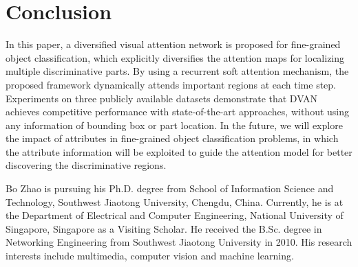 \documentclass[journal]{IEEEtran}
\begin{document}
\section{Conclusion}
\label{sec:conclusion}

In this paper, a diversified visual attention network is proposed for fine-grained object classification, which explicitly diversifies the attention maps for localizing multiple discriminative parts. By using a recurrent soft attention mechanism, the proposed framework dynamically attends important regions at each time step. Experiments on three publicly available datasets demonstrate that DVAN achieves competitive performance with state-of-the-art approaches, without using any information of bounding box or part location. In the future, we will explore the impact of attributes in fine-grained object classification problems, in which the attribute information will be exploited to guide the attention model for better discovering the discriminative regions.





\begin{IEEEbiography}{Bo Zhao} is pursuing his Ph.D. degree from School of Information Science and Technology, Southwest Jiaotong University, Chengdu, China. Currently, he is at the Department of Electrical and Computer Engineering, National University of Singapore, Singapore as a Visiting Scholar. He received the B.Sc. degree in Networking Engineering from Southwest Jiaotong University in 2010. His research interests include multimedia, computer vision and machine learning.
\end{IEEEbiography}
\end{document}
